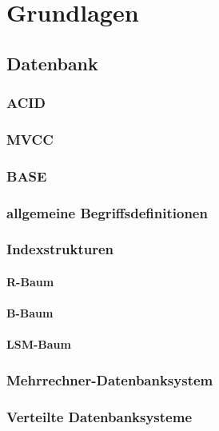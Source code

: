 \section{Grundlagen}


\subsection{Datenbank}

\subsubsection{ACID}

\subsubsection{MVCC}

\subsubsection{BASE}

\subsubsection{allgemeine Begriffsdefinitionen}

\subsubsection{Indexstrukturen}

\paragraph{R-Baum}

\paragraph{B-Baum}

\paragraph{LSM-Baum}

\subsubsection{Mehrrechner-Datenbanksystem}

\subsubsection{Verteilte Datenbanksysteme}

